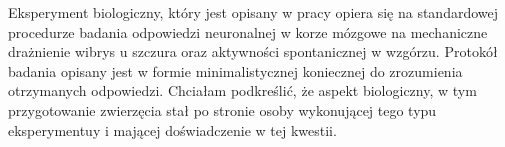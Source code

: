 \begin{frame}[t]

    \begin{block}{\tb}
    \end{block}
    Eksperyment biologiczny, który jest opisany w pracy opiera się na standardowej procedurze badania odpowiedzi neuronalnej w korze mózgowe na mechaniczne drażnienie wibrys u szczura oraz aktywności spontanicznej w wzgórzu. Protokół badania opisany jest w formie minimalistycznej koniecznej do zrozumienia otrzymanych odpowiedzi. Chciałam podkreślić, że aspekt biologiczny, w tym przygotowanie zwierzęcia stał po stronie osoby wykonującej tego typu eksperymentuy i mającej doświadczenie w tej kwestii.
\end{frame}

